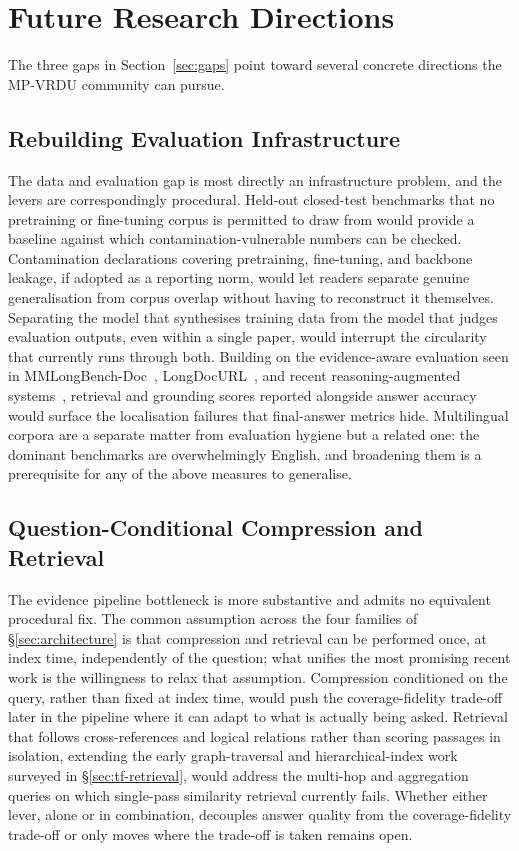 \documentclass[11pt]{article}
\begin{document}
\section{Future Research Directions}
\label{sec:future}

The three gaps in Section~\ref{sec:gaps} point toward several concrete directions the MP-VRDU community can pursue.

\subsection{Rebuilding Evaluation Infrastructure}
The data and evaluation gap is most directly an infrastructure problem, and the levers are correspondingly procedural. Held-out closed-test benchmarks that no pretraining or fine-tuning corpus is permitted to draw from would provide a baseline against which contamination-vulnerable numbers can be checked. Contamination declarations covering pretraining, fine-tuning, and backbone leakage, if adopted as a reporting norm, would let readers separate genuine generalisation from corpus overlap without having to reconstruct it themselves. Separating the model that synthesises training data from the model that judges evaluation outputs, even within a single paper, would interrupt the circularity that currently runs through both. Building on the evidence-aware evaluation seen in MMLongBench-Doc~\cite{ma2024mmlongbenchdoc}, LongDocURL~\cite{deng2025longdocurl}, and recent reasoning-augmented systems~\cite{xiong2026docr1,zhu2025doclens}, retrieval and grounding scores reported alongside answer accuracy would surface the localisation failures that final-answer metrics hide. Multilingual corpora are a separate matter from evaluation hygiene but a related one: the dominant benchmarks are overwhelmingly English, and broadening them is a prerequisite for any of the above measures to generalise.

\subsection{Question-Conditional Compression and Retrieval}
The evidence pipeline bottleneck is more substantive and admits no equivalent procedural fix. The common assumption across the four families of \S\ref{sec:architecture} is that compression and retrieval can be performed once, at index time, independently of the question; what unifies the most promising recent work is the willingness to relax that assumption. Compression conditioned on the query, rather than fixed at index time, would push the coverage-fidelity trade-off later in the pipeline where it can adapt to what is actually being asked. Retrieval that follows cross-references and logical relations rather than scoring passages in isolation, extending the early graph-traversal and hierarchical-index work surveyed in \S\ref{sec:tf-retrieval}, would address the multi-hop and aggregation queries on which single-pass similarity retrieval currently fails. Whether either lever, alone or in combination, decouples answer quality from the coverage-fidelity trade-off or only moves where the trade-off is taken remains open.
\end{document}
